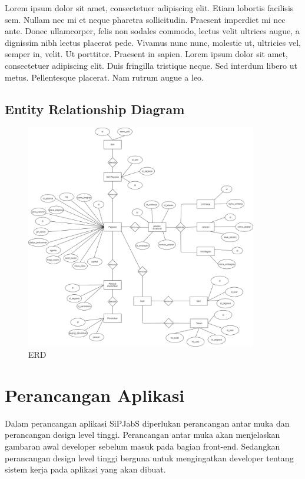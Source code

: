 Lorem ipsum dolor sit amet, consectetuer adipiscing elit. Etiam lobortis facilisis sem.  Nullam nec mi et neque pharetra sollicitudin.  Praesent imperdiet  mi nec ante. Donec ullamcorper, felis non sodales commodo, lectus velit ultrices augue, a dignissim nibh lectus placerat pede. Vivamus nunc nunc, molestie ut, ultricies vel, semper in, velit. Ut porttitor. Praesent in sapien. Lorem ipsum dolor sit amet, consectetuer adipiscing elit. Duis fringilla tristique neque. Sed interdum libero ut metus. Pellentesque placerat.  Nam rutrum augue a leo.  

\subsection{Entity Relationship Diagram}

\begin{figure}
	\centering
	\includegraphics[width=0.9\textwidth]
	{pics/diagram/erd.png}
	\caption{ERD}
	\label{fig:32}
\end{figure}

\section{Perancangan Aplikasi}
Dalam perancangan aplikasi SiPJabS diperlukan perancangan antar muka dan perancangan design level tinggi. Perancangan antar muka akan menjelaskan gambaran awal  developer sebelum masuk pada bagian front-end.  Sedangkan perancangan design level tinggi berguna untuk mengingatkan developer tentang sistem kerja pada aplikasi yang akan dibuat.


